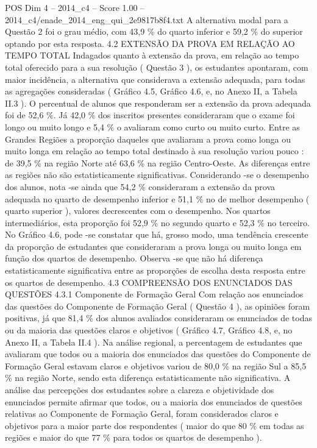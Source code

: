 \begin{textsample}{POS Dim 4 – 2014\_c4 – Score 1.00 – 2014\_c4/enade\_2014\_eng\_qui\_2e9817b8f4.txt}
A alternativa modal para a Questão 2 foi o grau médio, com 43,9 \% do quarto inferior e 59,2 \% do superior optando por esta resposta. 4.2 EXTENSÃO DA PROVA EM RELAÇÃO AO TEMPO TOTAL Indagados quanto à extensão da prova, em relação ao tempo total oferecido para a sua resolução ( Questão 3 ), os estudantes apontaram, com maior incidência, a alternativa que considerava a extensão adequada, para todas as agregações consideradas ( Gráfico 4.5, Gráfico 4.6, e, no Anexo II, a Tabela II.3 ).
O percentual de alunos que responderam ser a extensão da prova adequada foi de 52,6 \%.
Já 42,0 \% dos inscritos presentes consideraram que o exame foi longo ou muito longo e 5,4 \% o avaliaram como curto ou muito curto.
Entre as Grandes Regiões a proporção daqueles que avaliaram a prova como longa ou muito longa em relação ao tempo total destinado à sua resolução variou pouco : de 39,5 \% na região Norte até 63,6 \% na região Centro-Oeste.
As diferenças entre as regiões não são estatisticamente significativas.
Considerando -se o desempenho dos alunos, nota -se ainda que 54,2 \% consideraram a extensão da prova adequada no quarto de desempenho inferior e 51,1 \% no de melhor desempenho ( quarto superior ), valores decrescentes com o desempenho.
Nos quartos intermediários, esta proporção foi 52,9 \% no segundo quarto e 52,3 \% no terceiro.
No Gráfico 4.6, pode -se constatar que há, grosso modo, uma tendência crescente da proporção de estudantes que consideraram a prova longa ou muito longa em função dos quartos de desempenho.
Observa -se que não há diferença estatisticamente significativa entre as proporções de escolha desta resposta entre os quartos de desempenho. 4.3 COMPREENSÃO DOS ENUNCIADOS DAS QUESTÕES 4.3.1 Componente de Formação Geral Com relação aos enunciados das questões do Componente de Formação Geral ( Questão 4 ), as opiniões foram positivas, já que 81,4 \% dos alunos avaliados consideraram os enunciados de todas ou da maioria das questões claros e objetivos ( Gráfico 4.7, Gráfico 4.8, e, no Anexo II, a Tabela II.4 ).
Na análise regional, a percentagem de estudantes que avaliaram que todos ou a maioria dos enunciados das questões do Componente de Formação Geral estavam claros e objetivos variou de 80,0 \% na região Sul a 85,5 \% na região Norte, sendo esta diferença estatisticamente não significativa.
A análise das percepções dos estudantes sobre a clareza e objetividade dos enunciados permite afirmar que todos, ou a maioria dos enunciados de questões relativas ao Componente de Formação Geral, foram considerados claros e objetivos para a maior parte dos respondentes ( maior do que 80 \% em todas as regiões e maior do que 77 \% para todos os quartos de desempenho ).

\end{textsample}
